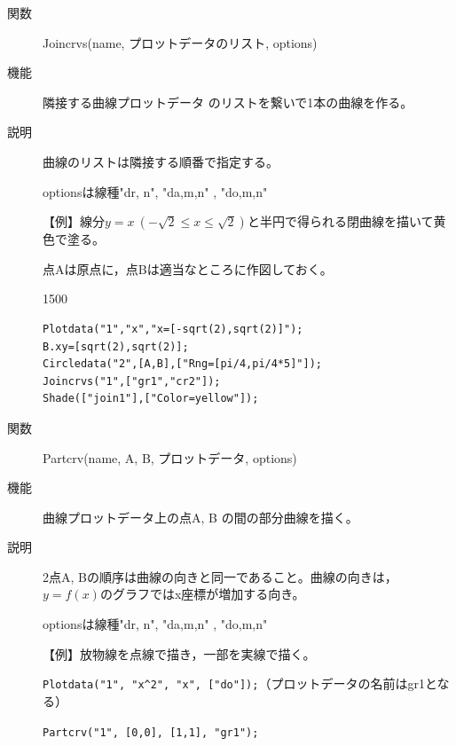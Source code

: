 \documentclass[papersize,a4paper,12pt,uplatex]{jsarticle}
\begin{document}
\begin{description}
\vspace{\baselineskip}
\hypertarget{joincrvs}{}
\item[関数]Joincrvs(name, プロットデータのリスト, options) 
\item[機能]隣接する曲線プロットデータ のリストを繋いで1本の曲線を作る。
\item[説明]曲線のリストは隣接する順番で指定する。

optionsは線種"dr, n", "da,m,n" , "do,m,n"

\vspace{\baselineskip}
【例】線分$y=x\ (-\sqrt{2} \leq x \leq \sqrt{2})$と半円で得られる閉曲線を描いて黄色で塗る。

点Aは原点に，点Bは適当なところに作図しておく。

\begin{layer}{150}{0}
\end{layer}

\begin{verbatim}
Plotdata("1","x","x=[-sqrt(2),sqrt(2)]");
B.xy=[sqrt(2),sqrt(2)];
Circledata("2",[A,B],["Rng=[pi/4,pi/4*5]"]);
Joincrvs("1",["gr1","cr2"]);
Shade(["join1"],["Color=yellow"]);
\end{verbatim}
\vspace{5mm}

\vspace{\baselineskip}
\hypertarget{partcrv}{}
\item[関数]Partcrv(name, A, B, プロットデータ, options) 
\item[機能]曲線プロットデータ上の点A, B の間の部分曲線を描く。
\item[説明]2点A, Bの順序は曲線の向きと同一であること。曲線の向きは，$y=f(x)$のグラフではx座標が増加する向き。

optionsは線種"dr, n", "da,m,n" , "do,m,n"

\vspace{\baselineskip}
【例】放物線を点線で描き，一部を実線で描く。

\verb|Plotdata("1", "x^2", "x", ["do"]);|（プロットデータの名前はgr1となる）

\verb|Partcrv("1", [0,0], [1,1], "gr1");|

\begin{center}  \end{center}


\end{description}
\end{document}
